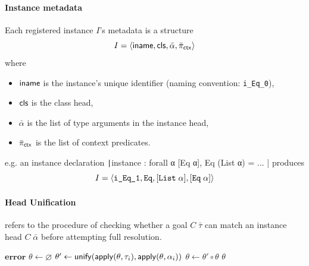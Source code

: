 \documentclass[a4paper, 11pt]{article}
\theoremstyle{remark}\newtheorem*{remark}{Remark}
\theoremstyle{definition}\newtheorem*{definition}{Definition}
\begin{document}
\paragraph{Instance metadata} Each registered instance \(I\)'s metadata is a structure
\[
I = \langle \mathsf{iname}, \mathsf{cls},\bar{\alpha},\bar{\pi}_{\mathsf{ctx}} \rangle
\]
where
\begin{itemize}
\item \(\mathsf{iname}\) is the instance's unique identifier (naming convention: \texttt{i\_Eq\_0}),
\item \(\mathsf{cls}\) is the class head,
\item \(\bar{\alpha}\) is the list of type arguments in the instance head,
\item \(\bar{\pi}_{\mathsf{ctx}}\) is the list of context predicates.
\end{itemize}
e.g. an instance declaration \texttt|instance : forall α [Eq α], Eq (List α) = ... | produces
\[
I = \langle \texttt{i\_Eq\_1}, \texttt{Eq}, [\texttt{List}\;\alpha], [\texttt{Eq}\;\alpha] \rangle
\]

\paragraph{Head Unification} refers to the procedure of checking whether a goal \(C\;\bar{\tau}\) can
match an instance head \(C\;\bar\alpha\) before attempting full resolution.

\begin{algorithm}[H]
\caption{Head Unification}
\begin{algorithmic}[1]
  \State \Return $\mathbf{error}$
  \EndIf
  \State $\theta \gets \varnothing$
  \State $\theta' \gets \mathsf{unify}(\mathsf{apply}(\theta, \tau_i), \mathsf{apply}(\theta, \alpha_i))$
  \State $\theta \gets \theta' \circ \theta$
  \EndFor
  \State \Return $\theta$
  \EndFunction
\end{algorithmic}
\end{algorithm}
\end{document}
